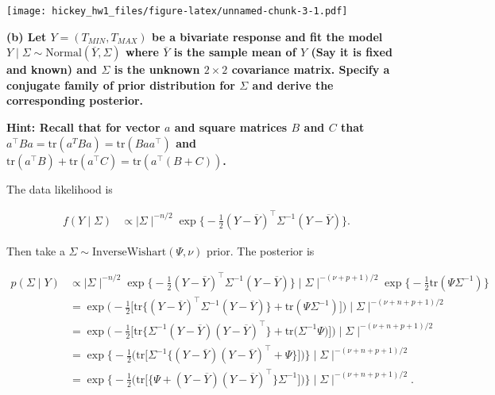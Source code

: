 \documentclass[
]{article}
\begin{document}
\texttt{[image: hickey\_hw1\_files/figure-latex/unnamed-chunk-3-1.pdf]}

\textbf{(b) Let \(Y = (T_{MIN}, T_{MAX})\) be a bivariate response and
fit the model
\(Y \mid \Sigma \sim \text{Normal}(\overline{ Y }, \Sigma)\) where
\(\overline{ Y }\) is the sample mean of \(Y\) (Say it is fixed and
known) and \(\Sigma\) is the unknown \(2 \times 2\) covariance matrix.
Specify a conjugate family of prior distribution for \(\Sigma\) and
derive the corresponding posterior.}

\textbf{Hint: Recall that for vector \(a\) and square matrices \(B\) and
\(C\) that
\(a^{\top}Ba = \text{tr}( a^{T} B a ) = \text{tr}( Baa^{\top} )\) and
\(\text{tr}( a^{\top}B ) + \text{tr}(a^{\top} C ) = \text{tr}(a^{\top} (B+C) )\).}

The data likelihood is

\begin{align*}
f(Y \mid \Sigma) & \propto \mid \Sigma \mid^{-n/2} \exp \Big\{  -\frac{ 1 }{  2}(Y - \overline{ Y })^{\top} \Sigma^{-1} (Y - \overline{ Y })\Big\}.
\end{align*}

Then take a \(\Sigma \sim \text{InverseWishart}(\Psi, \nu)\) prior. The
posterior is

\begin{align*}
p(\Sigma \mid Y) & \propto \mid \Sigma \mid^{-n/2} \exp \Big\{  -\frac{ 1 }{  2}(Y - \overline{ Y })^{\top} \Sigma^{-1} (Y - \overline{ Y })\Big\}
  \mid \Sigma \mid ^{-(\nu + p + 1) / 2} 
  \exp \Big\{  -\frac{ 1 }{ 2 } \text{tr}(\Psi \Sigma^{-1}  ) \Big\} \\
  & = \exp \Big(  -\frac{ 1 }{  2}\Big[ \text{tr}\Big\{(Y - \overline{ Y })^{\top} \Sigma^{-1} (Y - \overline{ Y })\Big\} + \text{tr}(\Psi \Sigma^{-1})  \Big]\Big)
  \mid \Sigma \mid ^{-(\nu + n + p + 1) / 2} \\
  & = \exp \Big(  -\frac{ 1 }{  2}\Big[ \text{tr}\Big\{ \Sigma^{-1} (Y - \overline{ Y })(Y - \overline{ Y })^{\top}\Big\} + \text{tr}(\Sigma^{-1} \Psi\Big)  \Big]\Big)
  \mid \Sigma \mid ^{-(\nu + n + p + 1) / 2} \\
  & = \exp \Big\{  -\frac{ 1 }{  2}\Big( \text{tr}\Big[ \Sigma^{-1} \Big\{(Y - \overline{ Y })(Y - \overline{ Y })^{\top}+ \Psi  \Big\} \Big]  \Big)\Big\} 
  \mid \Sigma \mid ^{-(\nu + n + p + 1) / 2} \\
  & = \exp \Big\{  -\frac{ 1 }{  2}\Big( \text{tr}\Big[ \Big\{ \Psi + (Y - \overline{ Y })(Y - \overline{ Y })^{\top} \Big\} \Sigma^{-1} \Big]  \Big)\Big\} 
  \mid \Sigma \mid ^{-(\nu + n + p + 1) / 2} .

\end{align*}
\end{document}
